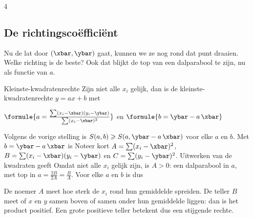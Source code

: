 \begin{alleenvoor}{4}
\begin{oefeningen}
\end{oefeningen}

\subsection{De richtingscoëfficiënt}

Nu de lat door $(\xbar, \ybar)$ gaat, kunnen we ze nog rond dat punt draaien. Welke richting is de beste? Ook dat blijkt de top van een dalparabool te zijn, nu als functie van $a$.

\begin{theorie}
\begin{stelling}{Kleinste-kwadratenrechte}
Zijn niet alle $x_i$ gelijk, dan is de kleinste-kwadratenrechte $y = ax + b$ met

\vspace{1mm}
\qquad $\formule{a = \frac{\sum (x_i - \xbar)(y_i - \ybar)}{\sum (x_i - \xbar)^2}}$ \qquad en \qquad $\formule{b = \ybar - a\,\xbar}$
\end{stelling}

\begin{bewijs}
Volgens de vorige stelling is $S(a, b) \geqslant S(a, \ybar - a\,\xbar)$ voor elke $a$ en $b$. Met $b = \ybar - a\,\xbar$ is
Noteer kort $A = \sum (x_i - \xbar)^2$, $B = \sum (x_i - \xbar)(y_i - \ybar)$ en $C = \sum (y_i - \ybar)^2$. Uitwerken van de kwadraten geeft
Omdat niet alle $x_i$ gelijk zijn, is $A > 0$: een dalparabool in $a$, met top in $a = \frac{2B}{2A} = \frac{B}{A}$. Voor elke $a$ en $b$ is dus
\end{bewijs}
\end{theorie}

De noemer $A$ meet hoe sterk de $x_i$ rond hun gemiddelde spreiden. De teller $B$ meet of $x$ en $y$ samen boven of samen onder hun gemiddelde liggen: dan is het product positief. Een grote positieve teller betekent dus een stijgende rechte.


\end{alleenvoor}
